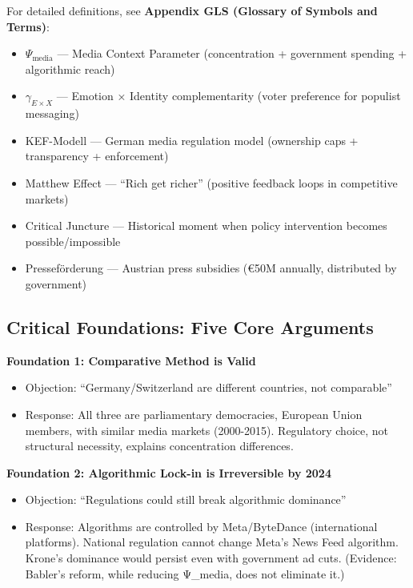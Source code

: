 {For detailed definitions, see \textbf{Appendix GLS (Glossary of Symbols and Terms)}:

\begin{itemize}[nosep]
\item $\Psi_{\text{media}}$ --- Media Context Parameter (concentration + government spending + algorithmic reach)
\item $\gamma_{E \times X}$ --- Emotion × Identity complementarity (voter preference for populist messaging)
\item KEF-Modell --- German media regulation model (ownership caps + transparency + enforcement)
\item Matthew Effect --- ``Rich get richer'' (positive feedback loops in competitive markets)
\item Critical Juncture --- Historical moment when policy intervention becomes possible/impossible
\item Presseförderung --- Austrian press subsidies (€50M annually, distributed by government)
\end{itemize}


\subsection*{Critical Foundations: Five Core Arguments}

\textbf{Foundation 1: Comparative Method is Valid}
\begin{itemize}
\item Objection: ``Germany/Switzerland are different countries, not comparable''
\item Response: All three are parliamentary democracies, European Union members, with similar media markets (2000-2015).
  Regulatory choice, not structural necessity, explains concentration differences.
\end{itemize}

\textbf{Foundation 2: Algorithmic Lock-in is Irreversible by 2024}
\begin{itemize}
\item Objection: ``Regulations could still break algorithmic dominance''
\item Response: Algorithms are controlled by Meta/ByteDance (international platforms).
  National regulation cannot change Meta's News Feed algorithm. Krone's dominance would persist even with government ad cuts.
  (Evidence: Babler's reform, while reducing Ψ_media, does not eliminate it.)
\end{itemize}

}
